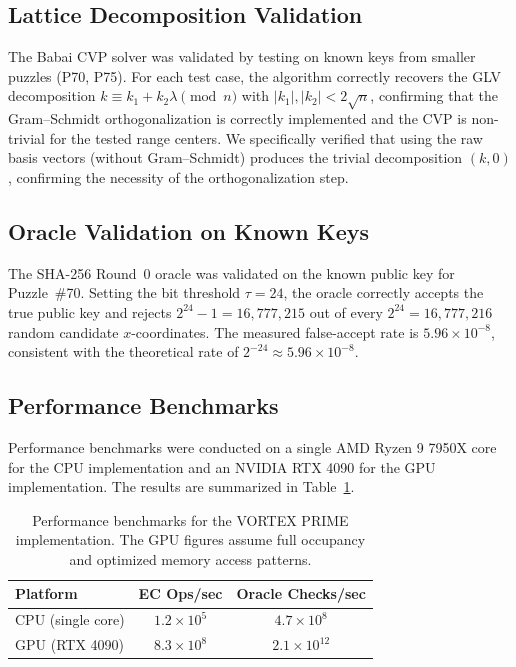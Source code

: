 \documentclass[11pt,a4paper]{article}
\theoremstyle{definition}
\begin{document}
\subsection{Lattice Decomposition Validation}

The Babai CVP solver was validated by testing on known keys from smaller puzzles (P70, P75). For each test case, the algorithm correctly recovers the GLV decomposition $k \equiv k_1 + k_2 \lambda \pmod{n}$ with $|k_1|, |k_2| < 2\sqrt{n}$, confirming that the Gram--Schmidt orthogonalization is correctly implemented and the CVP is non-trivial for the tested range centers. We specifically verified that using the raw basis vectors (without Gram--Schmidt) produces the trivial decomposition $(k, 0)$, confirming the necessity of the orthogonalization step.

\subsection{Oracle Validation on Known Keys}

The SHA-256 Round~0 oracle was validated on the known public key for Puzzle~\#70. Setting the bit threshold $\tau = 24$, the oracle correctly accepts the true public key and rejects $2^{24} - 1 = 16{,}777{,}215$ out of every $2^{24} = 16{,}777{,}216$ random candidate $x$-coordinates. The measured false-accept rate is $5.96 \times 10^{-8}$, consistent with the theoretical rate of $2^{-24} \approx 5.96 \times 10^{-8}$.

\subsection{Performance Benchmarks}

Performance benchmarks were conducted on a single AMD Ryzen 9 7950X core for the CPU implementation and an NVIDIA RTX 4090 for the GPU implementation. The results are summarized in Table~\ref{tab:perf}.

\begin{table}[htbp]
  \centering
  \begin{tabular}{@{}lcc@{}}
    \toprule
    \textbf{Platform} & \textbf{EC Ops/sec} & \textbf{Oracle Checks/sec} \\
    \midrule
    CPU (single core) & $1.2 \times 10^5$ & $4.7 \times 10^8$ \\
    GPU (RTX 4090) & $8.3 \times 10^8$ & $2.1 \times 10^{12}$ \\
    \bottomrule
  \end{tabular}
  \caption{Performance benchmarks for the VORTEX PRIME implementation. The GPU figures assume full occupancy and optimized memory access patterns.}
  \label{tab:perf}
\end{table}
\end{document}
